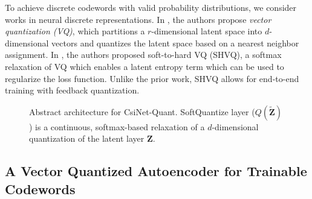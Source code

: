 To achieve discrete codewords with valid probability distributions, we consider works in neural discrete representations. In \cite{ref:Oord2017Neural}, the authors propose \emph{vector quantization (VQ)}, which partitions a $r$-dimensional latent space into $d$-dimensional vectors and quantizes the latent space based on a nearest neighbor assignment. In \cite{ref:Agustsson2017SoftToHard}, the authors proposed soft-to-hard VQ (SHVQ), a softmax relaxation of VQ which enables a latent entropy term which can be used to regularize the loss function.  Unlike the prior work, SHVQ allows for end-to-end training with feedback quantization.

\begin{figure}[!hbtp]
\centering
\def\svgwidth{0.8\columnwidth}

\caption{Abstract architecture for CsiNet-Quant. SoftQuantize layer ($Q(\tilde{\mathbf Z})$) is a continuous, softmax-based relaxation of a $d$-dimensional quantization of the latent layer $\mathbf Z$.}
\label{fig:csinet_quant}
\end{figure}

\subsection{A Vector Quantized Autoencoder for Trainable Codewords}

